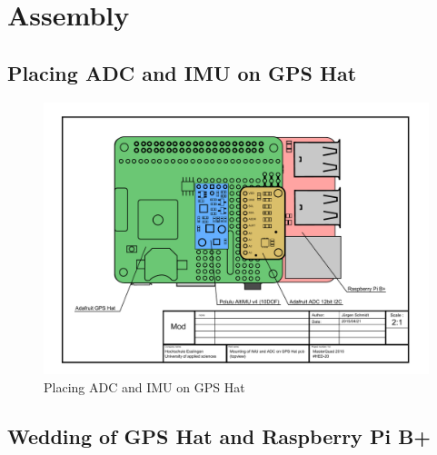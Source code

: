 \chapter{Assembly}
\label{sec:assemb}

\section{Placing ADC and IMU on GPS Hat}
\label{sec:assemb:sensorsOnHat}
\begin{figure}[H]
    \centering
    \includegraphics[width=\textwidth]{fig/ch-rpi-hardware/A4_tech_draw_topview_sensor_mountingPositions}
    \caption{Placing ADC and IMU on GPS Hat}
    \label{fig:assemb:sensorMount}
\end{figure}

\section{Wedding of GPS Hat and Raspberry Pi B+}
\label{sec:assemb:wedding}
